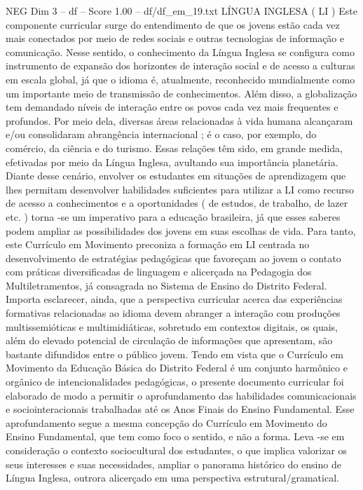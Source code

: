 \begin{textsample}{NEG Dim 3 – df – Score 1.00 – df/df\_em\_19.txt}  \label{ex:f3_neg_163}
LÍNGUA INGLESA ( LI ) Este componente curricular surge do entendimento de que os jovens estão cada vez mais conectados por meio de redes sociais e outras tecnologias de informação e comunicação.
Nesse sentido, o conhecimento da Língua Inglesa se configura como instrumento de expansão dos horizontes de interação social e de acesso a culturas em escala global, já que o idioma é, atualmente, reconhecido mundialmente como um importante meio de transmissão de conhecimentos.
Além disso, a globalização tem demandado níveis de interação entre os povos cada vez mais frequentes e profundos.
Por meio dela, diversas áreas relacionadas à vida humana alcançaram e/ou consolidaram abrangência internacional ; é o caso, por exemplo, do comércio, da ciência e do turismo.
Essas relações têm sido, em grande medida, efetivadas por meio da Língua Inglesa, avultando sua importância planetária.
Diante desse cenário, envolver os estudantes em situações de aprendizagem que lhes permitam desenvolver habilidades suficientes para utilizar a LI como recurso de acesso a conhecimentos e a oportunidades ( de estudos, de trabalho, de lazer etc. ) torna -se um imperativo para a educação brasileira, já que esses saberes podem ampliar as possibilidades dos jovens em suas escolhas de vida.
Para tanto, este Currículo em Movimento preconiza a formação em LI centrada no desenvolvimento de estratégias pedagógicas que favoreçam ao jovem o contato com práticas diversificadas de linguagem e alicerçada na Pedagogia dos Multiletramentos, já consagrada no Sistema de Ensino do Distrito Federal.
Importa esclarecer, ainda, que a perspectiva curricular acerca das experiências formativas relacionadas ao idioma devem abranger a interação com produções multissemióticas e multimidiáticas, sobretudo em contextos digitais, os quais, além do elevado potencial de circulação de informações que apresentam, são bastante difundidos entre o público jovem.
Tendo em vista que o Currículo em Movimento da Educação Básica do Distrito Federal é um conjunto harmônico e orgânico de intencionalidades pedagógicas, o presente documento curricular foi elaborado de modo a permitir o aprofundamento das habilidades comunicacionais e sociointeracionais trabalhadas até os Anos Finais do Ensino Fundamental.
Esse aprofundamento segue a mesma concepção do Currículo em Movimento do Ensino Fundamental, que tem como foco o sentido, e não a forma.
Leva -se em consideração o contexto sociocultural dos estudantes, o que implica valorizar os seus interesses e suas necessidades, ampliar o panorama histórico do ensino de Língua Inglesa, outrora alicerçado em uma perspectiva estrutural/gramatical.

\end{textsample}

